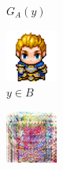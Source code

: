\documentclass[twocolumn,11pt]{ctexart}
\begin{document}
\begin{figure}[htb]
\begin{subfigure}[b]{0.23\linewidth}
        \caption{$G_A(y)$}
      \end{subfigure}
      \begin{subfigure}[b]{0.23\linewidth}
        \includegraphics[width=\linewidth]{exp2_epoch100_real_B.png}
        \caption{$y \in B$}
      \end{subfigure}
      \begin{subfigure}[b]{0.23\linewidth}
        \includegraphics[width=\linewidth]{exp2_epoch100_fake_A.png}

\end{subfigure}
\end{figure}
\end{document}

